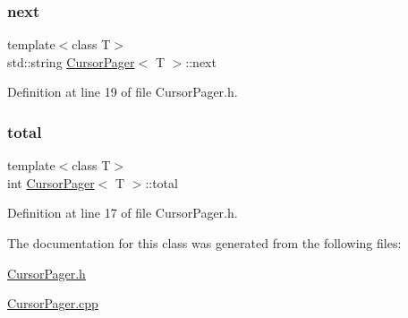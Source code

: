 \mbox{\label{class_cursor_pager_acc143185d46973f2733af18409c22ce8}} 
\subsubsection{\texorpdfstring{next}{next}}
{\footnotesize\ttfamily template$<$class T$>$ \\
std\+::string \mbox{\hyperlink{class_cursor_pager}{Cursor\+Pager}}$<$ T $>$\+::next\hspace{0.3cm}{\ttfamily [private]}}



Definition at line 19 of file Cursor\+Pager.\+h.

\mbox{\label{class_cursor_pager_aae1bd2df9e1844beca1d12a590707fc3}} 
\subsubsection{\texorpdfstring{total}{total}}
{\footnotesize\ttfamily template$<$class T$>$ \\
int \mbox{\hyperlink{class_cursor_pager}{Cursor\+Pager}}$<$ T $>$\+::total\hspace{0.3cm}{\ttfamily [private]}}



Definition at line 17 of file Cursor\+Pager.\+h.



The documentation for this class was generated from the following files\+:\begin{DoxyCompactItemize}
\item 
\mbox{\hyperlink{_cursor_pager_8h}{Cursor\+Pager.\+h}}\item 
\mbox{\hyperlink{_cursor_pager_8cpp}{Cursor\+Pager.\+cpp}}\end{DoxyCompactItemize}
